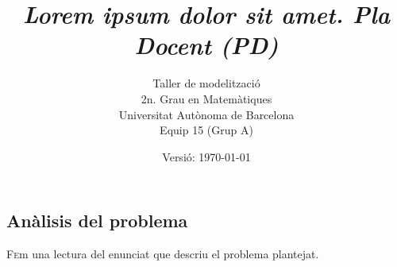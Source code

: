 \documentclass[10pt]{proc}
\title{\emph{\color{redviolet!75!black} Lorem ipsum dolor sit amet.  Pla Docent {(PD)}}}
\author{ Taller de modelització \\ 2n. Grau en  Matemàtiques \\ Universitat Autònoma de Barcelona \\ Equip 15 (Grup A)\\ }
\date{Versió: \today}
\begin{document}
	\tableofcontents
\begin{tcolorbox}[colframe=white,colback=redviolet!20,sharp corners=all,size=minimal,halign=center,valign=center]
\section{Anàlisis del problema}
\end{tcolorbox}
\lettrine{F}em una lectura del enunciat que descriu el problema plantejat. 

\vspace{5mm}
\end{document}
